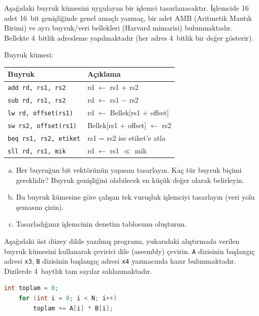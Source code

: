 \begin{alistirma}[\zor]
Aşağıdaki buyruk kümesini uygulayan bir işlemci tasarlanacaktır. İşlemcide 16 adet 16~bit genişliğinde genel amaçlı yazmaç, bir adet AMB (Aritmetik Mantık Birimi) ve ayrı buyruk/veri bellekleri (Harvard mimarisi) bulunmaktadır. Bellekte 4~bitlik adresleme yapılmaktadır (her adres 4~bitlik bir değer gösterir).

Buyruk kümesi:
\begin{center}
\small
\begin{tabular}{ll}
\toprule
\textbf{Buyruk} & \textbf{Açıklama} \\
\midrule
\texttt{add rd, rs1, rs2} & rd $\leftarrow$ rs1 + rs2 \\
\texttt{sub rd, rs1, rs2} & rd $\leftarrow$ rs1 $-$ rs2 \\
\texttt{lw rd, offset(rs1)} & rd $\leftarrow$ Bellek[rs1 + offset] \\
\texttt{sw rs2, offset(rs1)} & Bellek[rs1 + offset] $\leftarrow$ rs2 \\
\texttt{beq rs1, rs2, etiket} & rs1 = rs2 ise etiket'e atla \\
\texttt{sll rd, rs1, mik} & rd $\leftarrow$ rs1 $\ll$ mik \\
\bottomrule
\end{tabular}
\end{center}

\begin{enumerate}[(a)]
    \item Her buyruğun bit vektörünün yapısını tasarlayın. Kaç tür buyruk biçimi gereklidir? Buyruk genişliğini olabilecek en küçük değer olarak belirleyin.
    \item Bu buyruk kümesine göre çalışan tek vuruşluk işlemciyi tasarlayın (veri yolu şemasını çizin).
    \item Tasarladığınız işlemcinin denetim tablosunu oluşturun.
\end{enumerate}
\end{alistirma}

\begin{alistirma}[\orta]
Aşağıdaki üst düzey dilde yazılmış programı, yukarıdaki alıştırmada verilen buyruk kümesini kullanarak çevirici dile (assembly) çevirin. \texttt{A} dizisinin başlangıç adresi \texttt{x3}, \texttt{B} dizisinin başlangıç adresi \texttt{x4} yazmacında hazır bulunmaktadır. Dizilerde 4~baytlık tam sayılar saklanmaktadır.
\begin{lstlisting}[language=C, style=alistirma-kod]
    int toplam = 0;
    for (int i = 0; i < N; i++)
        toplam += A[i] * B[i];
\end{lstlisting}
\end{alistirma}

